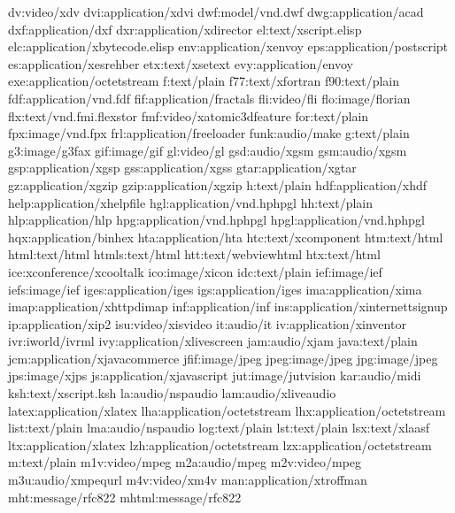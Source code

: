 \documentclass[letterpaper,12pt,english]{sphinxmanual}
\begin{document}
\begin{sphinxVerbatim}[commandchars=\\\{\}]
dv:video/x\PYGZhy{}dv
dvi:application/x\PYGZhy{}dvi
dwf:model/vnd.dwf
dwg:application/acad
dxf:application/dxf
dxr:application/x\PYGZhy{}director
el:text/x\PYGZhy{}script.elisp
elc:application/x\PYGZhy{}bytecode.elisp
env:application/x\PYGZhy{}envoy
eps:application/postscript
es:application/x\PYGZhy{}esrehber
etx:text/x\PYGZhy{}setext
evy:application/envoy
exe:application/octet\PYGZhy{}stream
f:text/plain
f77:text/x\PYGZhy{}fortran
f90:text/plain
fdf:application/vnd.fdf
fif:application/fractals
fli:video/fli
flo:image/florian
flx:text/vnd.fmi.flexstor
fmf:video/x\PYGZhy{}atomic3d\PYGZhy{}feature
for:text/plain
fpx:image/vnd.fpx
frl:application/freeloader
funk:audio/make
g:text/plain
g3:image/g3fax
gif:image/gif
gl:video/gl
gsd:audio/x\PYGZhy{}gsm
gsm:audio/x\PYGZhy{}gsm
gsp:application/x\PYGZhy{}gsp
gss:application/x\PYGZhy{}gss
gtar:application/x\PYGZhy{}gtar
gz:application/x\PYGZhy{}gzip
gzip:application/x\PYGZhy{}gzip
h:text/plain
hdf:application/x\PYGZhy{}hdf
help:application/x\PYGZhy{}helpfile
hgl:application/vnd.hp\PYGZhy{}hpgl
hh:text/plain
hlp:application/hlp
hpg:application/vnd.hp\PYGZhy{}hpgl
hpgl:application/vnd.hp\PYGZhy{}hpgl
hqx:application/binhex
hta:application/hta
htc:text/x\PYGZhy{}component
htm:text/html
html:text/html
htmls:text/html
htt:text/webviewhtml
htx:text/html
ice:x\PYGZhy{}conference/x\PYGZhy{}cooltalk
ico:image/x\PYGZhy{}icon
idc:text/plain
ief:image/ief
iefs:image/ief
iges:application/iges
igs:application/iges
ima:application/x\PYGZhy{}ima
imap:application/x\PYGZhy{}httpd\PYGZhy{}imap
inf:application/inf
ins:application/x\PYGZhy{}internett\PYGZhy{}signup
ip:application/x\PYGZhy{}ip2
isu:video/x\PYGZhy{}isvideo
it:audio/it
iv:application/x\PYGZhy{}inventor
ivr:i\PYGZhy{}world/i\PYGZhy{}vrml
ivy:application/x\PYGZhy{}livescreen
jam:audio/x\PYGZhy{}jam
java:text/plain
jcm:application/x\PYGZhy{}java\PYGZhy{}commerce
jfif:image/jpeg
jpeg:image/jpeg
jpg:image/jpeg
jps:image/x\PYGZhy{}jps
js:application/x\PYGZhy{}javascript
jut:image/jutvision
kar:audio/midi
ksh:text/x\PYGZhy{}script.ksh
la:audio/nspaudio
lam:audio/x\PYGZhy{}liveaudio
latex:application/x\PYGZhy{}latex
lha:application/octet\PYGZhy{}stream
lhx:application/octet\PYGZhy{}stream
list:text/plain
lma:audio/nspaudio
log:text/plain
lst:text/plain
lsx:text/x\PYGZhy{}la\PYGZhy{}asf
ltx:application/x\PYGZhy{}latex
lzh:application/octet\PYGZhy{}stream
lzx:application/octet\PYGZhy{}stream
m:text/plain
m1v:video/mpeg
m2a:audio/mpeg
m2v:video/mpeg
m3u:audio/x\PYGZhy{}mpequrl
m4v:video/x\PYGZhy{}m4v
man:application/x\PYGZhy{}troff\PYGZhy{}man
mht:message/rfc822
mhtml:message/rfc822

\end{sphinxVerbatim}
\end{document}
